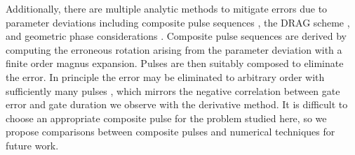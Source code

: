 Additionally, there are multiple analytic methods 
to mitigate errors due to parameter deviations
including composite pulse sequences \cite{merrill2014progress},
the DRAG scheme \cite{krantz2019quantum}, and
geometric phase considerations
\cite{xu2020nonadiabatic, han2020experimental}.
Composite pulse sequences are derived by computing
the erroneous rotation arising from the parameter deviation
with a finite order magnus expansion.
Pulses are then suitably composed to eliminate the
error. In principle the error may be eliminated
to arbitrary order with sufficiently many pulses \cite{merrill2014progress},
which mirrors the negative correlation between
gate error and gate duration we observe with the derivative method.
It is difficult to choose an appropriate composite pulse
for the problem studied here,
so we propose comparisons between composite pulses and numerical techniques
for future work.
